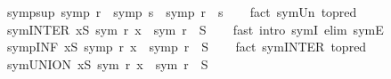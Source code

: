 \begin{isabellebody}
%
\endisadelimproof
\isanewline
{}\isamarkupfalse%
\ symp{\isacharunderscore}{\kern0pt}sup{\isacharcolon}{\kern0pt}\ {\isachardoublequoteopen}symp\ r\ {\isasymLongrightarrow}\ symp\ s\ {\isasymLongrightarrow}\ symp\ {\isacharparenleft}{\kern0pt}r\ {\isasymsqunion}\ s{\isacharparenright}{\kern0pt}{\isachardoublequoteclose}\isanewline
%
\isadelimproof
\ \ %
\endisadelimproof
%
\isatagproof
{}\isamarkupfalse%
\ {\isacharparenleft}{\kern0pt}fact\ sym{\isacharunderscore}{\kern0pt}Un\ {\isacharbrackleft}{\kern0pt}to{\isacharunderscore}{\kern0pt}pred{\isacharbrackright}{\kern0pt}{\isacharparenright}{\kern0pt}%
\endisatagproof
{\isafoldproof}%
%
\isadelimproof
\isanewline
%
\endisadelimproof
\isanewline
{}\isamarkupfalse%
\ sym{\isacharunderscore}{\kern0pt}INTER{\isacharcolon}{\kern0pt}\ {\isachardoublequoteopen}{\isasymforall}x{\isasymin}S{\isachardot}{\kern0pt}\ sym\ {\isacharparenleft}{\kern0pt}r\ x{\isacharparenright}{\kern0pt}\ {\isasymLongrightarrow}\ sym\ {\isacharparenleft}{\kern0pt}{\isasymInter}{\isacharparenleft}{\kern0pt}r\ {\isacharbackquote}{\kern0pt}\ S{\isacharparenright}{\kern0pt}{\isacharparenright}{\kern0pt}{\isachardoublequoteclose}\isanewline
%
\isadelimproof
\ \ %
\endisadelimproof
%
\isatagproof
{}\isamarkupfalse%
\ {\isacharparenleft}{\kern0pt}fast\ intro{\isacharcolon}{\kern0pt}\ symI\ elim{\isacharcolon}{\kern0pt}\ symE{\isacharparenright}{\kern0pt}%
\endisatagproof
{\isafoldproof}%
%
\isadelimproof
\isanewline
%
\endisadelimproof
\isanewline
{}\isamarkupfalse%
\ symp{\isacharunderscore}{\kern0pt}INF{\isacharcolon}{\kern0pt}\ {\isachardoublequoteopen}{\isasymforall}x{\isasymin}S{\isachardot}{\kern0pt}\ symp\ {\isacharparenleft}{\kern0pt}r\ x{\isacharparenright}{\kern0pt}\ {\isasymLongrightarrow}\ symp\ {\isacharparenleft}{\kern0pt}{\isasymSqinter}{\isacharparenleft}{\kern0pt}r\ {\isacharbackquote}{\kern0pt}\ S{\isacharparenright}{\kern0pt}{\isacharparenright}{\kern0pt}{\isachardoublequoteclose}\isanewline
%
\isadelimproof
\ \ %
\endisadelimproof
%
\isatagproof
{}\isamarkupfalse%
\ {\isacharparenleft}{\kern0pt}fact\ sym{\isacharunderscore}{\kern0pt}INTER\ {\isacharbrackleft}{\kern0pt}to{\isacharunderscore}{\kern0pt}pred{\isacharbrackright}{\kern0pt}{\isacharparenright}{\kern0pt}%
\endisatagproof
{\isafoldproof}%
%
\isadelimproof
\isanewline
%
\endisadelimproof
\isanewline
{}\isamarkupfalse%
\ sym{\isacharunderscore}{\kern0pt}UNION{\isacharcolon}{\kern0pt}\ {\isachardoublequoteopen}{\isasymforall}x{\isasymin}S{\isachardot}{\kern0pt}\ sym\ {\isacharparenleft}{\kern0pt}r\ x{\isacharparenright}{\kern0pt}\ {\isasymLongrightarrow}\ sym\ {\isacharparenleft}{\kern0pt}{\isasymUnion}{\isacharparenleft}{\kern0pt}r\ {\isacharbackquote}{\kern0pt}\ S{\isacharparenright}{\kern0pt}{\isacharparenright}{\kern0pt}{\isachardoublequoteclose}\isanewline

\end{isabellebody}
